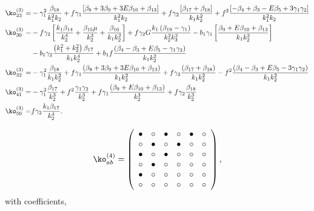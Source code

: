 {\begin{align*}
\ko_{23}^{(3)}=& -\gamma_1^2 \frac{\beta_{18}}{k_1^2 k_2} + f \gamma_1 \frac{\left[ \beta_{8} + 3 \beta_{9} + 3 E \beta_{10} + \beta_{13}\right]}{k_1^2 k_2} + f \gamma_2 \frac{\left[ \beta_{17} + \beta_{18}\right]}{k_1 k_2^2} + f^2 \frac{\left[ -{\beta_{4}+\beta_{3}} - E \beta_{5} + 3 \gamma_1 \gamma_2 \right]}{k_1^2 k_2}\\
%
\ko_{30}^{(3)}=& -f \gamma_2 \left[ \frac{k_1 \beta_{14}}{k_2^4} + \frac{\beta_{15} \mu}{k_2^3} + \frac{\beta_{16}}{k_1 k_2^2} \right] + f \gamma_2 G \frac{k_1 \left(\beta_{19} - \gamma_1 \right)}{k_2^2 k_3^2} - b_1 \gamma_1 \left[ \frac{\beta_{9} + E \beta_{10} + \beta_{13}}{k_1 k_2^2}  \right] \\
&- b_1 \gamma_2 \frac{\left(k_1^2 + k_2^2\right) \beta_{17} }{k_1 k_2^4} + b_1 f \frac{\left({\beta_{4}-\beta_{3}} + E \beta_{5} - \gamma_1 \gamma_2 \right)}{k_1 k_2^2}\\
%
\ko_{32}^{(3)}=& - \gamma_1^2 \frac{\beta_{18}}{k_1 k_2^2} + f \gamma_1 \frac{\left(\beta_{8} + 3 \beta_{9} + 3 E \beta_{10} + \beta_{13} \right)}{k_1 k_2^2} + f \gamma_2 \frac{\left(\beta_{17} + \beta_{18} \right)}{k_1 k_2^2} - f^2 \frac{\left({\beta_{4}-\beta_{3}} + E \beta_{5} - 3 \gamma_1 \gamma_2 \right)}{k_1 k_2^2}\\
%
\ko_{41}^{(3)}=& - \gamma_1^2 \frac{\beta_{17}}{k_2^3} + f^2 \frac{\gamma_1 \gamma_2}{k_2^3} + f \gamma_1 \frac{\left(\beta_{9} + E \beta_{10} + \beta_{13} \right)}{k_2^3} + f \gamma_2 \frac{\beta_{18}}{k_2^3}\\
\ko_{50}^{(3)}=& f \gamma_2 \frac{k_1 \beta_{17}}{k_2^4}.
\end{align*}

\begin{equation}
	\ko^{(4)}_{ab}= 
 \left( \begin {array}{cccccc} \bullet &\circ &\bullet &\circ 
&\bullet &\circ \\  \circ &\bullet &\circ &
\bullet &\circ &\circ \\  \bullet &\circ &
\bullet &\circ &\circ &\circ \\  \circ &
\bullet &\circ &\circ &\circ &\circ \\  
\bullet &\circ &\circ &\circ &\circ &\circ 
\\  \circ &\circ &\circ &\circ &\circ &
\circ \end {array} \right), 
\end{equation}
with coefficients, 

}
